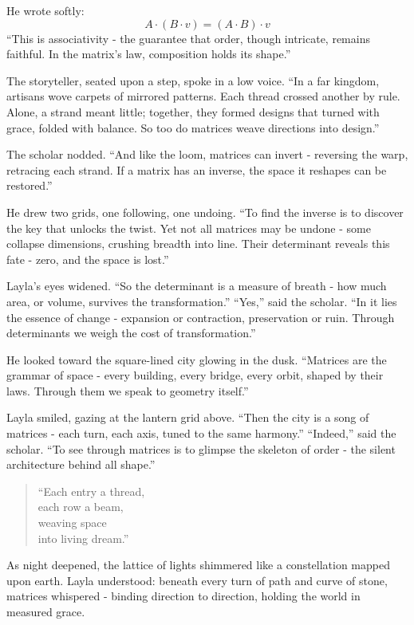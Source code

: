 \documentclass[
  letterpaper,
  DIV=11,
  numbers=noendperiod]{scrreprt}
\begin{document}
He wrote softly: \[
A \cdot (B \cdot v) = (A \cdot B) \cdot v
\] ``This is associativity - the guarantee that order, though intricate,
remains faithful. In the matrix's law, composition holds its shape.''

The storyteller, seated upon a step, spoke in a low voice. ``In a far
kingdom, artisans wove carpets of mirrored patterns. Each thread crossed
another by rule. Alone, a strand meant little; together, they formed
designs that turned with grace, folded with balance. So too do matrices
weave directions into design.''

The scholar nodded. ``And like the loom, matrices can invert - reversing
the warp, retracing each strand. If a matrix has an inverse, the space
it reshapes can be restored.''

He drew two grids, one following, one undoing. ``To find the inverse is
to discover the key that unlocks the twist. Yet not all matrices may be
undone - some collapse dimensions, crushing breadth into line. Their
determinant reveals this fate - zero, and the space is lost.''

Layla's eyes widened. ``So the determinant is a measure of breath - how
much area, or volume, survives the transformation.'' ``Yes,'' said the
scholar. ``In it lies the essence of change - expansion or contraction,
preservation or ruin. Through determinants we weigh the cost of
transformation.''

He looked toward the square-lined city glowing in the dusk. ``Matrices
are the grammar of space - every building, every bridge, every orbit,
shaped by their laws. Through them we speak to geometry itself.''

Layla smiled, gazing at the lantern grid above. ``Then the city is a
song of matrices - each turn, each axis, tuned to the same harmony.''
``Indeed,'' said the scholar. ``To see through matrices is to glimpse
the skeleton of order - the silent architecture behind all shape.''

\begin{quote}
``Each entry a thread,\\
each row a beam,\\
weaving space\\
into living dream.''
\end{quote}

As night deepened, the lattice of lights shimmered like a constellation
mapped upon earth. Layla understood: beneath every turn of path and
curve of stone, matrices whispered - binding direction to direction,
holding the world in measured grace.
\end{document}
